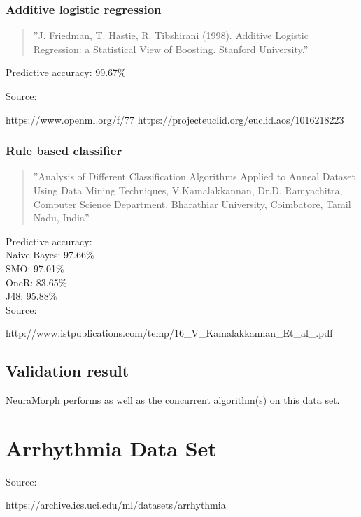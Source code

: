 \documentclass[8pt, a4paper]{article}
\begin{document}
\subsubsection{Additive logistic regression}

\begin{quote}
''J. Friedman, T. Hastie, R. Tibshirani (1998). Additive Logistic Regression: a Statistical View of Boosting. Stanford University.''
\end{quote}

Predictive accuracy: 99.67\%

Source:

https://www.openml.org/f/77
https://projecteuclid.org/euclid.aos/1016218223

\subsubsection{Rule based classifier}

\begin{quote}
''Analysis of Different Classification Algorithms Applied to Anneal
Dataset Using Data Mining Techniques, V.Kamalakkannan, Dr.D. Ramyachitra, Computer Science Department, Bharathiar University, Coimbatore, Tamil Nadu, India''
\end{quote}

Predictive accuracy:\\
Naive Bayes: 97.66\%\\
SMO: 97.01\%\\
OneR: 83.65\%\\
J48: 95.88\%\\

Source:

http://www.istpublications.com/temp/16_V_Kamalakkannan_Et_al_.pdf

\subsection{Validation result}

NeuraMorph performs as well as the concurrent algorithm(s) on this data set.




\section{Arrhythmia Data Set}

Source: 

https://archive.ics.uci.edu/ml/datasets/arrhythmia
\end{document}
